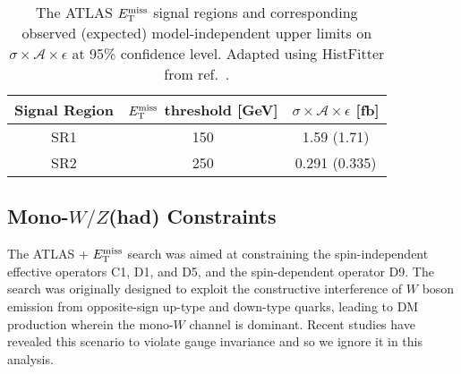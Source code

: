 \begin{table}[!htbp]
  \begin{center}
    \begin{tabular}{c|c|c}
      \hline
      \hline
      Signal Region & $E_{\mathrm{T}}^{\mathrm{miss}}$ threshold [GeV] & $\sigma \times \mathcal{A} \times \epsilon$ [fb] \\
      \hline
      SR1 & 150 & 1.59 (1.71) \\
      SR2 & 250 & 0.291 (0.335) \\
      \hline
      \hline
    \end{tabular}
  \end{center}
  \caption{The ATLAS \monoZ $E_{\mathrm{T}}^{\mathrm{miss}}$ signal regions and corresponding observed (expected) model-independent upper limits on $\sigma \times \mathcal{A} \times \epsilon$ at 95\% confidence level. Adapted using HistFitter from ref.~\cite{Aad:2014monoZlep}.}
  \label{tab:sigmalim_monoZ}
\end{table}

\subsection{Mono-$W/Z$(had) Constraints}
\label{monoWZ_constraints}

The ATLAS \monoWZ + $E_{\mathrm{T}}^{\mathrm{miss}}$ search \cite{Aad:2013monoWZ} was aimed at constraining the spin-independent effective operators C1, D1, and D5, and the spin-dependent operator D9. The search was originally designed to exploit the constructive interference of $W$ boson emission from opposite-sign up-type and down-type quarks, leading to DM production wherein the mono-$W$ channel is dominant. Recent studies \cite{Bell:gaugeInv} have revealed this scenario to violate gauge invariance and so we ignore it in this analysis.
%

